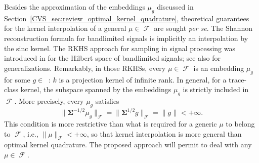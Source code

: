 \documentclass[twoside,11pt]{book}
\numberwithin{theorem}{chapter}
\numberwithin{definition}{chapter}
\numberwithin{proposition}{chapter}
\numberwithin{corollary}{chapter}
\numberwithin{example}{chapter}
\numberwithin{lemma}{chapter}
\numberwithin{assumption}{chapter}
\DeclareMathOperator{\F}{\mathcal{F}}
\DeclareMathOperator{\Ltwo}{\mathbb{L}_{2}(\mathrm{d} \omega)}
\newcommand{\pc}[1]{\textcolor{blue}{#1}}
\begin{document}
Besides the approximation of the embeddings $\mu_{g}$ discussed in Section~\ref{CVS_sec:review_optimal_kernel_quadrature}, theoretical guarantees for the kernel interpolation of a general $\mu\in\F$ are sought \emph{per se}. The Shannon reconstruction formula for bandlimited signals \citep{Sha48} is implicitly an interpolation by the sinc kernel.
The RKHS approach for sampling in signal processing was introduced in \citep{Yao67} for the Hilbert space of bandlimited signals;
see also \citep{NaWa91} for generalizations.
Remarkably, in those RKHSs, every $\mu \in \F$ is an embedding $\mu_{g}$ for some $g \in \Ltwo$: $k$ is a projection kernel of infinite rank. In general, for a trace-class kernel, the subspace spanned by the embeddings $\mu_{g}$ is strictly included in $\F$. More precisely, every $\mu_{g}$ satisfies
\begin{equation}
\|\bm{\Sigma}^{-1/2} \mu_{g}\|_{\F} = \|\bm{\Sigma}^{1/2} g\|_{\F} = \|g\|_{\Ltwo} < +\infty. \nonumber
\end{equation}
This condition is more restrictive than what is required for a generic $\mu$ to belong to $\F$, i.e., $\|\mu\|_{\F}< +\infty$, so that kernel interpolation is more general than optimal kernel quadrature. The proposed approach will permit to deal with any $\mu\in\F$.








%
\end{document}
